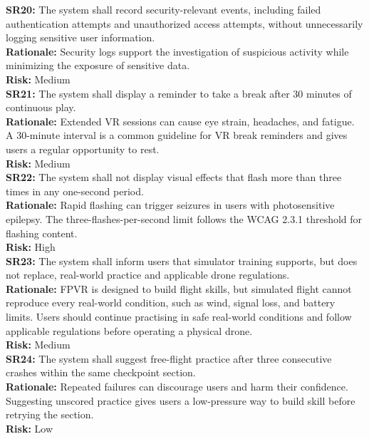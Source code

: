 \documentclass{article}
\newcommand{\reqdef}[1]{\textbf{#1:}}
\begin{document}
\noindent
\reqdef{SR20} The system shall record security-relevant events, including failed authentication attempts and unauthorized access attempts, without unnecessarily logging sensitive user information.\\
\textbf{Rationale:} Security logs support the investigation of suspicious activity while minimizing the exposure of sensitive data.\\
\textbf{Risk:} Medium\\[1em]

\noindent
\reqdef{SR21} The system shall display a reminder to take a break after 30 minutes of continuous play.\\
\textbf{Rationale:} Extended VR sessions can cause eye strain, headaches, and fatigue. A 30-minute interval is a common guideline for VR break reminders and gives users a regular opportunity to rest.\\
\textbf{Risk:} Medium\\[1em]

\noindent
\reqdef{SR22} The system shall not display visual effects that flash more than three times in any one-second period.\\
\textbf{Rationale:} Rapid flashing can trigger seizures in users with photosensitive epilepsy. The three-flashes-per-second limit follows the WCAG 2.3.1 threshold for flashing content.\\
\textbf{Risk:} High\\[1em]

\noindent
\reqdef{SR23} The system shall inform users that simulator training supports, but does not replace, real-world practice and applicable drone regulations.\\
\textbf{Rationale:} FPVR is designed to build flight skills, but simulated flight cannot reproduce every real-world condition, such as wind, signal loss, and battery limits. Users should continue practising in safe real-world conditions and follow applicable regulations before operating a physical drone.\\
\textbf{Risk:} Medium\\[1em]

\noindent
\reqdef{SR24} The system shall suggest free-flight practice after three consecutive crashes within the same checkpoint section.\\
\textbf{Rationale:} Repeated failures can discourage users and harm their confidence. Suggesting unscored practice gives users a low-pressure way to build skill before retrying the section.\\
\textbf{Risk:} Low
\end{document}
